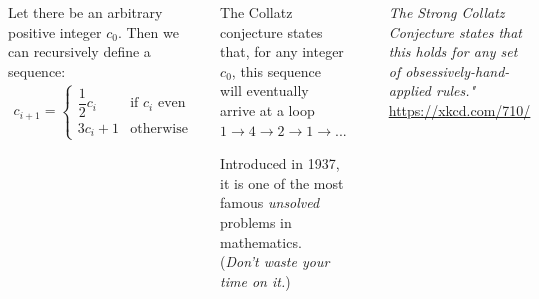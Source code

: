 
\begin{frame}
%
\begin{columns}[T]
\begin{defbox}
\small
Let there be an arbitrary positive integer $c_0$. Then we can recursively define a sequence:
\begin{align*}
	c_{i+1} = \begin{cases}
	\dfrac{1}{2}c_i & \text{if~} c_i \text{~even}\\
	3 c_i + 1 & \text{otherwise}
	\end{cases}
\end{align*}
\end{defbox}
%
\begin{hintbox}
\small
The Collatz conjecture states that, for any integer $c_0$, this sequence will eventually arrive at a loop $1 \to 4 \to 2 \to 1 \to ...$

Introduced in 1937, it is one of the most famous \emph{unsolved} problems in mathematics.\\
(\Thus \emph{Don't waste your time on it.})
\end{hintbox}
%
\includegraphics[width=.9\linewidth]{./gfx/08-xkcd-collatz}

\footnotesize
\emph{The Strong Collatz Conjecture states that this holds for any set of obsessively-hand-applied rules."}\\
\url{https://xkcd.com/710/}
\end{columns}
%
\end{frame}

